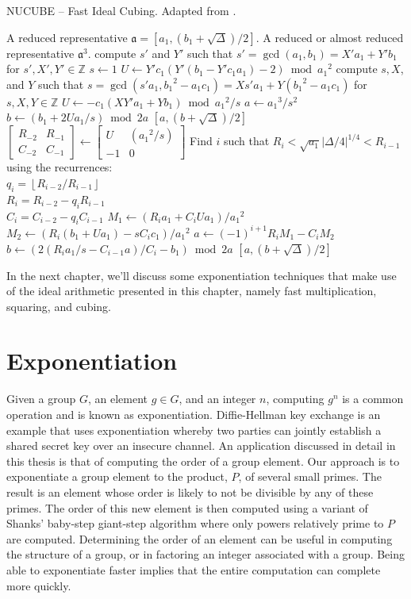 \documentclass{ucalgthes1}
\theoremstyle{definition}
\newcommand{\ZZ}{\mathbb{Z}}
\newcommand{\matrixtt}[4]{\left[ \begin{array}{rr} #1 & #2 \\ #3 & #4 \end{array} \right]}
\newcommand{\floor}[1]{\left\lfloor #1 \right\rfloor}
\begin{document}
\begin{algorithm}[h]
\caption{NUCUBE -- Fast Ideal Cubing. Adapted from \cite[p.26]{Imbert2010}.}
\label{alg:nucube}
\begin{algorithmic}[1]
\REQUIRE A reduced representative $\mathfrak a = [a_1, (b_1+\sqrt\Delta)/2]$.
\ENSURE A reduced or almost reduced representative $\mathfrak a^3$.
\STATE compute $s'$ and $Y'$ such that $s' = \gcd(a_1, b_1) = X'a_1 + Y'b_1$ for $s', X', Y' \in \ZZ$
	\STATE $s \gets 1$
	\STATE $U \gets Y'c_1(Y'(b_1 - Y'c_1a_1) - 2) \bmod {a_1}^2$
\ELSE
	\STATE compute $s, X$, and $Y$ such that $s = \gcd(s'a_1, {b_1}^2 - a_1c_1) = Xs'a_1 + Y({b_1}^2 - a_1c_1)$ for $s, X, Y \in \ZZ$
	\STATE $U \gets -c_1(XY'a_1+Yb_1) \bmod {a_1}^2/s$
\ENDIF
{}
	\STATE $a \gets {a_1}^3/s^2$
	\STATE $b \gets (b_1 + 2Ua_1/s) \bmod 2a$
	\RETURN $[a, (b+\sqrt\Delta)/2]$
\ENDIF
\STATE $\matrixtt{R_{-2}}{R_{-1}}{C_{-2}}{C_{-1}} \gets \matrixtt{U}{({a_1}^2/s)}{-1}{0}$
\STATE Find $i$ such that $R_i < \sqrt{a_1} |\Delta/4|^{1/4} < R_{i-1}$ using the recurrences: \\
       $q_i = \floor{R_{i-2}/R_{i-1}}$ \\
       $R_i = R_{i-2}-q_i R_{i-1}$ \\
       $C_i=C_{i-2}-q_i C_{i-1}$
\STATE $M_1 \gets (R_ia_1 + C_iUa_1) / {a_1}^2$
\STATE $M_2 \gets (R_i(b_1 + Ua_1) - sC_ic_1) / {a_1}^2$
\STATE $a \gets (-1)^{i+1} R_i M_1 - C_i M_2$
\STATE $b \gets (2(R_ia_1/s - C_{i-1}a)/C_i - b_1) \bmod 2a$
\RETURN $[a, (b+\sqrt\Delta)/2]$
\end{algorithmic}
\end{algorithm}

In the next chapter, we'll discuss some exponentiation techniques that make use of the ideal arithmetic presented in this chapter, namely fast multiplication, squaring, and cubing.


\chapter{Exponentiation}
\label{chap:exponentiation}

Given a group $G$, an element $g \in G$, and an integer $n$, computing $g^n$ is a common operation and is known as exponentiation.  Diffie-Hellman key exchange is an example that uses exponentiation whereby two parties can jointly establish a shared secret key over an insecure channel.  An application discussed in detail in this thesis is that of computing the order of a group element.  Our approach is to exponentiate a group element to the product, $P$, of several small primes.  The result is an element whose order is likely to not be divisible by any of these primes. The order of this new element is then computed using a variant of Shanks' baby-step giant-step algorithm where only powers relatively prime to $P$ are computed.  Determining the order of an element can be useful in computing the structure of a group, or in factoring an integer associated with a group.  Being able to exponentiate faster implies that the entire computation can complete more quickly.
\end{document}
